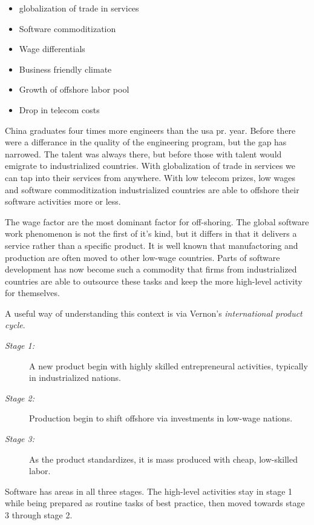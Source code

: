 \begin{itemize}
\item globalization of trade in services
\item Software commoditization
\item Wage differentials
\item Business friendly climate 
\item Growth of offshore labor pool
\item Drop in telecom costs
\end{itemize}

China graduates four times more engineers than the \gls{usa} pr. year. 
Before there were a differance in the quality of the engineering program, but the gap has narrowed. 
The talent was always there, but before those with talent would emigrate to industrialized countries. 
With globalization of trade in services we can tap into their services from anywhere. 
With low telecom prizes, low wages and software commoditization industrialized countries are able to offshore their software activities more or less. 

The wage factor are the most dominant factor for off-shoring.
The global software work phenomenon is not the first of it's kind, but it differs in that it delivers a service rather than a specific product. 
It is well known that manufactoring and production are often moved to other low-wage countries.
Parts of software development has now become such a commodity that firms from industrialized countries are able to outsource these tasks and keep the more high-level activity for themselves. 

A useful way of understanding this context is via Vernon's \textit{international product cycle}.
\begin{description}
\item[\textit{Stage 1:}]\hfill
A new product begin with highly skilled entrepreneural activities, typically in industrialized nations.
\item[\textit{Stage 2:}]\hfill
Production begin to shift offshore via investments in low-wage nations.
\item[\textit{Stage 3:}]\hfill
As the product standardizes, it is mass produced with cheap, low-skilled labor.
\end{description}


Software has areas in all three stages. The high-level activities stay in stage 1 while being prepared as routine tasks of best practice, then moved towards stage 3 through stage 2.

